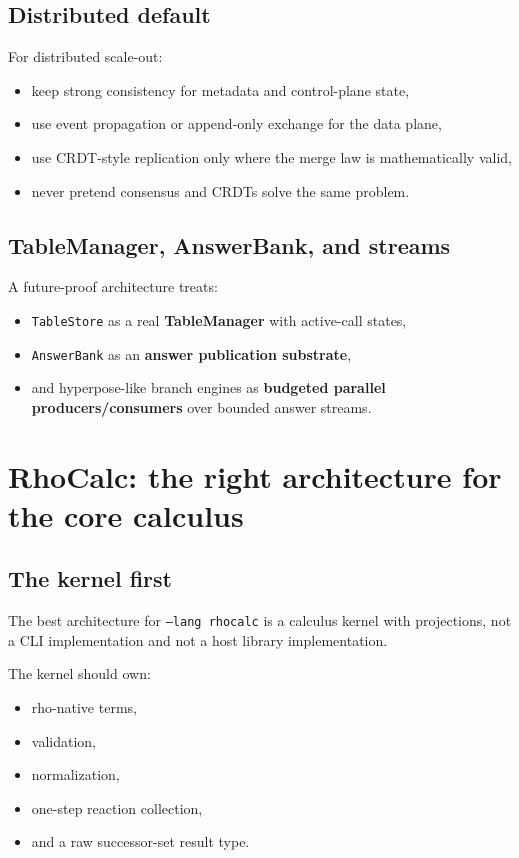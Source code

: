 \documentclass[11pt]{article}
\begin{document}
\subsection{Distributed default}
For distributed scale-out:
\begin{itemize}
  \item keep strong consistency for metadata and control-plane state,
  \item use event propagation or append-only exchange for the data plane,
  \item use CRDT-style replication only where the merge law is mathematically valid,
  \item never pretend consensus and CRDTs solve the same problem.
\end{itemize}

\subsection{TableManager, AnswerBank, and streams}
A future-proof architecture treats:
\begin{itemize}
  \item \texttt{TableStore} as a real \textbf{TableManager} with active-call states,
  \item \texttt{AnswerBank} as an \textbf{answer publication substrate},
  \item and hyperpose-like branch engines as \textbf{budgeted parallel producers/consumers} over bounded answer streams.
\end{itemize}

\section{RhoCalc: the right architecture for the core calculus}
\subsection{The kernel first}
The best architecture for \texttt{--lang rhocalc} is a calculus kernel with projections, not a CLI implementation and not a host library implementation.

The kernel should own:
\begin{itemize}
  \item rho-native terms,
  \item validation,
  \item normalization,
  \item one-step reaction collection,
  \item and a raw successor-set result type.
\end{itemize}
\end{document}
